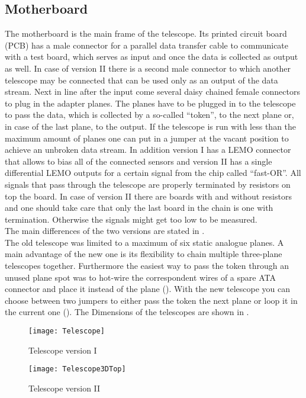 \subsection{Motherboard}\label{s210}
The motherboard is the main frame of the telescope. Its printed circuit board (PCB) has a male connector for a parallel data transfer cable to communicate with a test board, which serves as input and once the data is collected as output as well. In case of version II there is a second male connector to which another telescope may be connected that can be used only as an output of the data stream. Next in line after the input come several daisy chained female connectors to plug in the adapter planes. The planes have to be plugged in to the telescope to pass the data, which is collected by a so-called ``token'', to the next plane or, in case of the last plane, to the output. If the telescope is run with less than the maximum amount of planes one can put in a jumper at the vacant position to achieve an unbroken data stream. In addition version I has a LEMO connector that allows to bias all of the connected sensors and version II has a single differential LEMO outputs for a certain signal from the chip called ``fast-OR''. All signals that pass through the telescope are properly terminated by resistors on top the board. In case of version II there are boards with and without resistors and one should take care that only the last board in the chain is one with termination. Otherwise the signals might get too low to be measured.\\
The main differences of the two versions are stated in .\\
The old telescope was limited to a maximum of six static analogue planes. A main advantage of the new one is its flexibility to chain multiple three-plane telescopes together. %
Furthermore the easiest way to pass the token through an unused plane spot was to hot-wire the correspondent wires of a spare ATA connector and place it instead of the plane (). With the new telescope you can choose between two jumpers to either pass the token the next plane or loop it in the current one (). The Dimensions of the telescopes are shown in .
\begin{figure}[t]
	\begin{minipage}{6cm}
		\texttt{[image: Telescope]}
		\caption{Telescope version I}
		\label{p0}
	\end{minipage}
	\hfill
	\begin{minipage}{6cm}
		\texttt{[image: Telescope3DTop]}
		\caption{Telescope version II}
		\label{p1}
	\end{minipage}
\end{figure}
